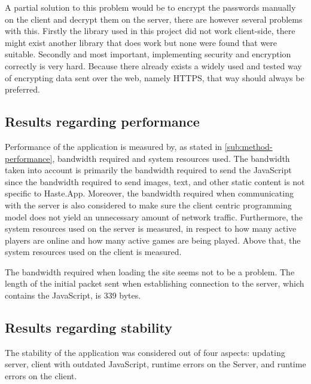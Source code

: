 \documentclass[a4paper]{article}
\begin{document}
A partial solution to this problem would be to encrypt the passwords manually on the client and decrypt them on the server, there are however several problems with this. Firstly the library used in this project did not work client-side, there might exist another library that does work but none were found that were suitable. Secondly and most important, implementing security and encryption correctly is very hard. Because there already exists a widely used and tested way of encrypting data sent over the web, namely HTTPS, that way should always be preferred. 

\subsection{Results regarding performance}

Performance of the application is measured by, as stated in \cref{sub:method-performance}, bandwidth required and system resources used. The bandwidth taken into account is primarily the bandwidth required to send the JavaScript since the bandwidth required to send images, text, and other static content is not specific to Haste.App. Moreover, the bandwidth required when communicating with the server is also considered to make sure the client centric programming model does not yield an unnecessary amount of network traffic. Furthermore, the system resources used on the server is measured, in respect to how many active players are online and how many active games are being played. Above that, the system resources used on the client is measured.

The bandwidth required when loading the site seems not to be a problem. The length of the initial packet sent when establishing connection to the server, which contains the JavaScript, is 339 bytes. 



\subsection{Results regarding stability}
The stability of the application was considered out of four aspects: updating server, client with outdated JavaScript, runtime errors on the Server, and runtime errors on the client.
\end{document}
